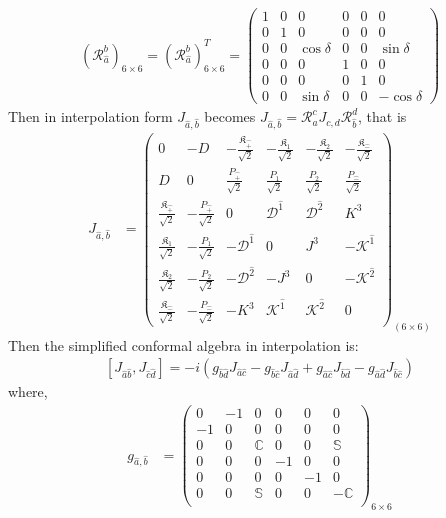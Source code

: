 \documentclass[aps,reprint,notitlepage,nofootinbib,superscriptaddress]{revtex4-1}
\newcommand{\itP}[1]{\hat{#1}}
\begin{document}
\begin{align}
    (\mathcal{R}_{\hat{a}}^{b})_{6\times6}=(\mathcal{R}_{\hat{a}}^{b})^T_{6\times6}=\begin{pmatrix}
    1&0&0&0&0&0\\
    0&1&0&0&0&0\\
    0&0&\cos{\delta}&0&0&\sin{\delta}\\
    0&0&0&1&0&0\\
    0&0&0&0&1&0\\
    0&0&\sin{\delta}&0&0&-\cos{\delta}
    \end{pmatrix}
\end{align}
Then in interpolation form $J_{\hat{a},\hat{b}}$ becomes $J_{\hat{a},\hat{b}}=\mathcal{R}_{\hat{a}}^{{c}}J_{c,d}\mathcal{R}_{\hat{b}}^{{d}}$, that is
\begin{align}
    J_{\hat{a},\hat{b}}&=\begin{pmatrix}
    0&-D&-\frac{\mathfrak{K}_{\hat{+}}}{\sqrt{2}}&-\frac{\mathfrak{K}_1}{\sqrt{2}}&-\frac{\mathfrak{K}_2}{\sqrt{2}}&-\frac{\mathfrak{K}_{\hat{-}}}{\sqrt{2}}\\
    D&0&\frac{P_{\hat{+}}}{\sqrt{2}}&\frac{P_{1}}{\sqrt{2}}&\frac{P_{2}}{\sqrt{2}}&\frac{P_{\hat{-}}}{\sqrt{2}}\\
    \frac{\mathfrak{K}_{\hat{+}}}{\sqrt{2}}&-\frac{P_{\hat{+}}}{\sqrt{2}}&0 & {\mathcal{D}}^{\itP{1}} & {\mathcal{D}}^{\itP{2}} & {K}^{3}\\
    \frac{\mathfrak{K}_1}{\sqrt{2}}&-\frac{P_{1}}{\sqrt{2}}&-{\mathcal{D}}^{\itP{1}} & 0 & {J}^{3} & -{\mathcal{K}}^{\itP{1}}\\
    \frac{\mathfrak{K}_2}{\sqrt{2}}&-\frac{P_{2}}{\sqrt{2}}&-{\mathcal{D}}^{\itP{2}} & -{J}^{3} & 0 & -{\mathcal{K}}^{\itP{2}}\\
    \frac{\mathfrak{K}_{\hat{-}}}{\sqrt{2}}&-\frac{P_{\hat{-}}}{\sqrt{2}}&-{K}^{3} & {\mathcal{K}}^{\itP{1}} & {\mathcal{K}}^{\itP{2}} & 0
  \end{pmatrix}_{(6\times6)}
\end{align}
Then the simplified conformal algebra in interpolation is:
  \begin{align}
      \left[J_{{\hat{a}}{\hat{b}}},J_{{\hat{c}}{\hat{d}}}\right]=-i\left(g_{{\hat{b}}{\hat{d}}}J_{{\hat{a}}{\hat{c}}}-g_{{\hat{b}}{\hat{c}}}J_{{\hat{a}}{\hat{d}}}+g_{{\hat{a}}{\hat{c}}}J_{{\hat{b}}{\hat{d}}}-g_{{\hat{a}}{\hat{d}}}J_{{\hat{b}}{\hat{c}}}\right)\label{simplesrint}
  \end{align}
where, 
\begin{align}
    g_{\hat{a},\hat{b}}&=\begin{pmatrix}
  0&-1&0&0&0&0\\
  -1&0&0&0&0&0\\
  0&0&\mathbb{C}&0&0&\mathbb{S}\\
  0&0&0&-1&0&0\\
  0&0&0&0&-1&0\\
  0&0&\mathbb{S}&0&0&-\mathbb{C}\\
  \end{pmatrix}_{6\times6}
\end{align}
\end{document}

